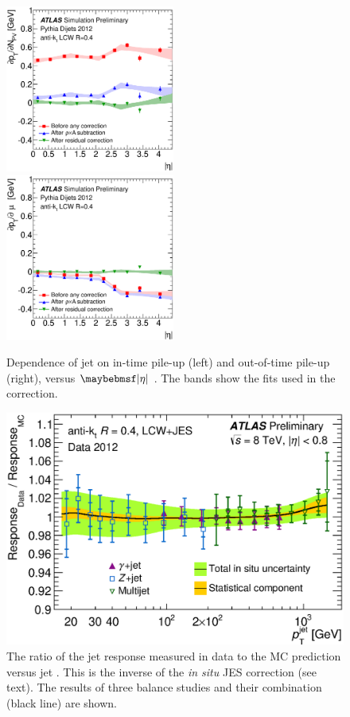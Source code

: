 \begin{figure}
	\includegraphics[width=0.495\textwidth]{tex/selection/jet_pu_npv}
	\hfill
	\includegraphics[width=0.495\textwidth]{tex/selection/jet_pu_mu}
	\caption{Dependence of jet \pt on in-time pile-up (left) and out-of-time pile-up 
	(right), versus $\mods{\eta}$ \cite{Jets:PileupCorrection:2012}. The bands show the 
	fits used in the correction.}
	\label{fig:objects:jet_pu_corr}
\end{figure}

\begin{figure}
	\includegraphics[width=\mediumfigwidth]{tex/selection/jet_insitu_corr}
	\caption{The ratio of the jet response measured in data to the MC prediction versus 
	jet \pt. This is the inverse of the \textit{in situ} JES correction (see text). The 
	results of three \pt balance studies and their combination (black line) are shown.}
	\label{fig:objects:jet_insitu}
\end{figure}



